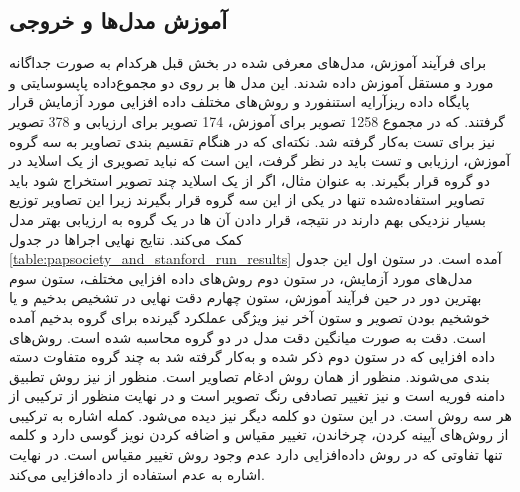 \subsection{آموزش مدل‌ها و خروجی}\label{subsec:آموزش مدل‌ها و خروجی}
برای فرآیند آموزش، مدل‌های معرفی شده در بخش قبل هرکدام به صورت جداگانه مورد و مستقل آموزش داده شدند. این مدل ها بر روی دو مجموع‌داده پاپسوسایتی و پایگاه داده ریزآرایه استنفورد و روش‌های مختلف داده افزایی مورد آزمایش قرار گرفتند. که در مجموع 1258 تصویر برای آموزش، 174 تصویر برای ارزیابی و 378 تصویر نیز برای تست به‌کار گرفته شد. نکته‌ای که در هنگام تقسیم بندی تصاویر به سه گروه آموزش، ارزیابی و تست باید در نظر گرفت، این است که نباید تصویری از یک اسلاید در دو گروه قرار بگیرند. به عنوان مثال، اگر از یک اسلاید چند تصویر استخراج شود باید تصاویر استفاده‌شده تنها در یکی از این سه گروه قرار بگیرند زیرا این تصاویر توزیع بسیار نزدیکی بهم دارند در نتیجه، قرار دادن آن ها در یک گروه به ارزیابی بهتر مدل کمک می‌کند.
نتایج نهایی اجراها در جدول \ref{table:papsociety_and_stanford_run_results} آمده است.
در ستون اول این جدول مدل‌های مورد آزمایش، در ستون دوم روش‌های داده افزایی مختلف، ستون سوم بهترین دور در حین فرآیند آموزش، ستون چهارم دقت نهایی در تشخیص بدخیم و یا خوشخیم بودن تصویر و ستون آخر نیز ویژگی عملکرد گیرنده برای گروه بدخیم آمده است. دقت به صورت میانگین دقت مدل در دو گروه محاسبه شده است.
روش‌های داده افزایی که در ستون دوم ذکر شده و به‌کار گرفته شد به چند گروه متفاوت دسته بندی می‌شوند. منظور از  همان روش ادغام تصاویر است. منظور از  نیز روش تطبیق دامنه فوریه است و  نیز تغییر تصادفی رنگ تصویر است و در نهایت منظور از  ترکیبی از هر سه روش است. در این ستون دو کلمه دیگر نیز دیده می‌شود. کمله  اشاره به ترکیبی از روش‌های آیینه کردن، چرخاندن، تغییر مقیاس و اضافه کردن نویز گوسی دارد و کلمه  تنها تفاوتی که در روش داده‌افزایی دارد عدم وجود روش تغییر مقیاس است. در نهایت  اشاره به عدم استفاده از داده‌افزایی می‌کند.

